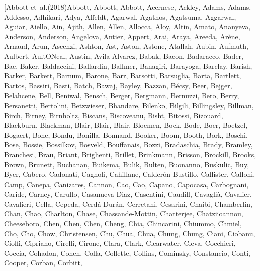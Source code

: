 \documentclass[times,tight]{aastex631}
\begin{document}
\begin{thebibliography}{}
\bibitem[{{Abbott} {et~al.}(2018){Abbott}, {Abbott}, {Abbott}, {Acernese},
  {Ackley}, {Adams}, {Adams}, {Addesso}, {Adhikari}, {Adya}, {Affeldt},
  {Agarwal}, {Agathos}, {Agatsuma}, {Aggarwal}, {Aguiar}, {Aiello}, {Ain},
  {Ajith}, {Allen}, {Allen}, {Allocca}, {Aloy}, {Altin}, {Amato}, {Ananyeva},
  {Anderson}, {Anderson}, {Angelova}, {Antier}, {Appert}, {Arai}, {Araya},
  {Areeda}, {Ar{\`e}ne}, {Arnaud}, {Arun}, {Ascenzi}, {Ashton}, {Ast}, {Aston},
  {Astone}, {Atallah}, {Aubin}, {Aufmuth}, {Aulbert}, {AultONeal}, {Austin},
  {Avila-Alvarez}, {Babak}, {Bacon}, {Badaracco}, {Bader}, {Bae}, {Baker},
  {Baldaccini}, {Ballardin}, {Ballmer}, {Banagiri}, {Barayoga}, {Barclay},
  {Barish}, {Barker}, {Barkett}, {Barnum}, {Barone}, {Barr}, {Barsotti},
  {Barsuglia}, {Barta}, {Bartlett}, {Bartos}, {Bassiri}, {Basti}, {Batch},
  {Bawaj}, {Bayley}, {Bazzan}, {B{\'e}csy}, {Beer}, {Bejger}, {Belahcene},
  {Bell}, {Beniwal}, {Bensch}, {Berger}, {Bergmann}, {Bernuzzi}, {Bero},
  {Berry}, {Bersanetti}, {Bertolini}, {Betzwieser}, {Bhandare}, {Bilenko},
  {Bilgili}, {Billingsley}, {Billman}, {Birch}, {Birney}, {Birnholtz},
  {Biscans}, {Biscoveanu}, {Bisht}, {Bitossi}, {Bizouard}, {Blackburn},
  {Blackman}, {Blair}, {Blair}, {Blair}, {Bloemen}, {Bock}, {Bode}, {Boer},
  {Boetzel}, {Bogaert}, {Bohe}, {Bondu}, {Bonilla}, {Bonnand}, {Booker},
  {Boom}, {Booth}, {Bork}, {Boschi}, {Bose}, {Bossie}, {Bossilkov}, {Bosveld},
  {Bouffanais}, {Bozzi}, {Bradaschia}, {Brady}, {Bramley}, {Branchesi}, {Brau},
  {Briant}, {Brighenti}, {Brillet}, {Brinkmann}, {Brisson}, {Brockill},
  {Brooks}, {Brown}, {Brunett}, {Buchanan}, {Buikema}, {Bulik}, {Bulten},
  {Buonanno}, {Buskulic}, {Buy}, {Byer}, {Cabero}, {Cadonati}, {Cagnoli},
  {Cahillane}, {Calder{\'o}n Bustillo}, {Callister}, {Calloni}, {Camp},
  {Canepa}, {Canizares}, {Cannon}, {Cao}, {Cao}, {Capano}, {Capocasa},
  {Carbognani}, {Caride}, {Carney}, {Carullo}, {Casanueva Diaz}, {Casentini},
  {Caudill}, {Cavagli{\`a}}, {Cavalier}, {Cavalieri}, {Cella}, {Cepeda},
  {Cerd{\'a}-Dur{\'a}n}, {Cerretani}, {Cesarini}, {Chaibi}, {Chamberlin},
  {Chan}, {Chao}, {Charlton}, {Chase}, {Chassande-Mottin}, {Chatterjee},
  {Chatziioannou}, {Cheeseboro}, {Chen}, {Chen}, {Chen}, {Cheng}, {Chia},
  {Chincarini}, {Chiummo}, {Chmiel}, {Cho}, {Cho}, {Chow}, {Christensen},
  {Chu}, {Chua}, {Chua}, {Chung}, {Chung}, {Ciani}, {Ciobanu}, {Ciolfi},
  {Cipriano}, {Cirelli}, {Cirone}, {Clara}, {Clark}, {Clearwater}, {Cleva},
  {Cocchieri}, {Coccia}, {Cohadon}, {Cohen}, {Colla}, {Collette}, {Collins},
  {Cominsky}, {Constancio}, {Conti}, {Cooper}, {Corban}, {Corbitt},
}
\end{thebibliography}
\end{document}
